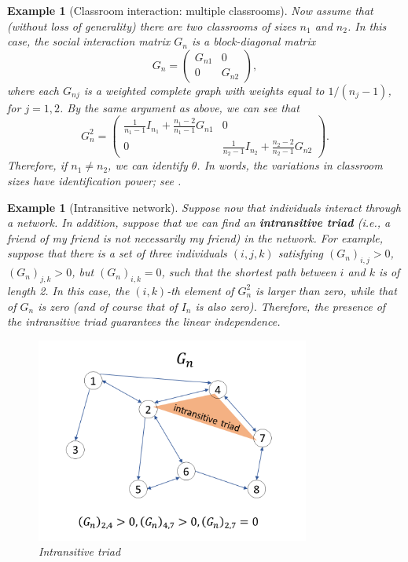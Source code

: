 \documentclass[10.5pt, A4paper, openany, uplatex]{book}
\newtheorem{example}[theorem]{Example}
\numberwithin{equation}{section}
\begin{document}
\begin{example}[Classroom interaction: multiple classrooms]\upshape
	Now assume that (without loss of generality) there are two classrooms of sizes $n_1$ and $n_2$.
	In this case, the social interaction matrix $G_n$ is a block-diagonal matrix
	\[
		G_n = \left( \begin{array}{cc}
		G_{n1} & 0 \\
		0 & G_{n2}		
		\end{array}\right),
	\]
	where each $G_{nj}$ is a weighted complete graph with weights equal to $1/(n_j - 1)$, for $j = 1,2$.
	By the same argument as above, we can see that
	\[
	G^2_n = \left( \begin{array}{cc}
	\frac{1}{n_1 - 1} I_{n_1} + \frac{n_1 - 2}{n_1 - 1} G_{n1} & 0 \\
	0 & 	\frac{1}{n_2 - 1} I_{n_2} + \frac{n_2 - 2}{n_2 - 1} G_{n2}
	\end{array}\right) .
	\]
	Therefore, if $n_1 \neq n_2$, we can identify $\theta$.
	In words, the variations in classroom sizes have identification power; see \cite{lee2007identification}.
\end{example}

\begin{example}[Intransitive network]\upshape
	Suppose now that individuals interact through a network. 
	In  addition, suppose that we can find an \textbf{intransitive triad} (i.e., a friend of my friend is not necessarily my friend) in the network.
	For example, suppose that there is a set of three individuals $(i, j, k)$ satisfying $(G_n)_{i,j} > 0$, $(G_n)_{j,k} > 0$, but $(G_n)_{i,k} = 0$, such that the shortest path between $i$ and $k$ is of length 2.
	In this case, the $(i, k)$-th element of $G_n^2$ is larger than zero, while that of $G_n$ is zero (and of course that of $I_n$ is also zero).
	Therefore, the presence of the intransitive triad guarantees the linear independence.
	\begin{figure}[h!]
	\begin{center}
		\includegraphics[width = 9cm]{intransitive.png}
		\caption{Intransitive triad}
	\end{center}
	\end{figure}
\end{example}
\end{document}
